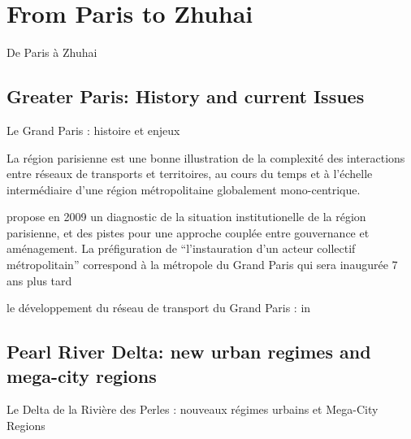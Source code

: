 



\newpage

\section[From Paris to Zhuhai][De Paris à Zhuhai]{From Paris to Zhuhai}{De Paris à Zhuhai}

\label{sec:casestudies}







\subsection[Greater Paris][Grand Paris]{Greater Paris: History and current Issues}{Le Grand Paris : histoire et enjeux}


La région parisienne est une bonne illustration de la complexité des interactions entre réseaux de transports et territoires, au cours du temps et à l'échelle intermédiaire d'une région métropolitaine globalement mono-centrique.

\cite{gilli2009paris} propose en 2009 un diagnostic de la situation institutionelle de la région parisienne, et des pistes pour une approche couplée entre gouvernance et aménagement. La préfiguration de ``l'instauration d'un acteur collectif métropolitain'' correspond à la métropole du Grand Paris qui sera inaugurée 7 ans plus tard


\cite{Padeiro2012}


le développement du réseau de transport du Grand Paris : in\cite{beauguitte:halshs-01068589}




\subsection[Pearl River Delta][Le Delta de la Rivière des Perles]{Pearl River Delta: new urban regimes and mega-city regions}{Le Delta de la Rivière des Perles : nouveaux régimes urbains et Mega-City Regions}



